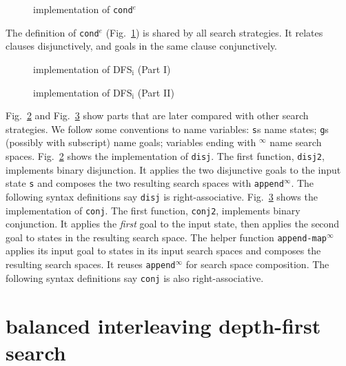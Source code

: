 \documentclass[format=acmlarge, review=true, authordraft=true]{acmart}
\newcommand{\conde}{\texttt{cond$^e$}}
\newcommand{\conj}{\texttt{conj}}
\newcommand{\disj}{\texttt{disj}}
\newcommand{\DFSi }[0]{DFS$_\textrm{i}$}
\begin{document}
\begin{figure}
	
	\caption{implementation of \conde}
	\label{conde}
\end{figure}

The definition of \conde{} (Fig.~\ref{conde}) is shared by all search 
strategies. It relates clauses disjunctively, and goals in the same 
clause conjunctively.

\begin{figure}
	
	\caption{implementation of \DFSi{} (Part I)}
	\label{DFSi-0}
\end{figure}

\begin{figure}
	
	\caption{implementation of \DFSi{} (Part II)}
	\label{DFSi-1}
\end{figure}


Fig.~\ref{DFSi-0} and Fig.~\ref{DFSi-1} show parts that are later compared 
with other search 
strategies. We follow some conventions to name variables: \texttt{s}s name 
states; \texttt{g}s (possibly with subscript) name goals; 
variables ending with $^\infty$ name search spaces. Fig.~\ref{DFSi-0} shows the 
implementation of \disj. The 
first function, \texttt{disj2}, implements binary disjunction. It applies the 
two disjunctive goals to the input state \texttt{s} and composes the two 
resulting search spaces with \texttt{append$^\infty$}. The following syntax 
definitions say \disj{} is right-associative. Fig.~\ref{DFSi-1} 
shows the implementation of \conj. The first function, \texttt{conj2}, 
implements binary conjunction. 
It applies the \emph{first} goal to the input state, then applies the second 
goal to states in the resulting search space. The helper function 
\texttt{append-map$^\infty$} applies its input goal to states 
in its input search spaces and composes the resulting search spaces. It reuses 
\texttt{append$^\infty$} for search space composition. The following syntax 
definitions say \conj{} is also right-associative.

\section{balanced interleaving depth-first search}
\end{document}

